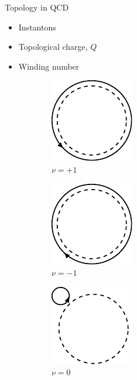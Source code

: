 \documentclass[10pt,show notes on second screen]{beamer}
\begin{document}
\begin{frame}{Topology in QCD}
\begin{itemize}
    \item <1->Instantons
    \item <2->Topological charge, $Q$
    \item <3->Winding number
\end{itemize}

\begin{block}
\begin{figure}
    \centering
    \begin{subfigure}{0.22\textwidth}
        \centering
        \includegraphics{../figures/illustrations/qcd/winding-number/winding-number1.pdf}
        \caption{$\nu=+1$}
    \end{subfigure}
    \begin{subfigure}{0.22\textwidth}
        \centering
        \includegraphics{../figures/illustrations/qcd/winding-number/winding-number-1.pdf}
        \caption{$\nu=-1$}
    \end{subfigure}
    \begin{subfigure}{0.22\textwidth}
        \centering
        \includegraphics{../figures/illustrations/qcd/winding-number/winding-number0.pdf}
        \caption{$\nu=0$}
    \end{subfigure}
    \begin{subfigure}{0.22\textwidth}

\end{subfigure}
\end{figure}
\end{block}
\end{frame}
\end{document}

